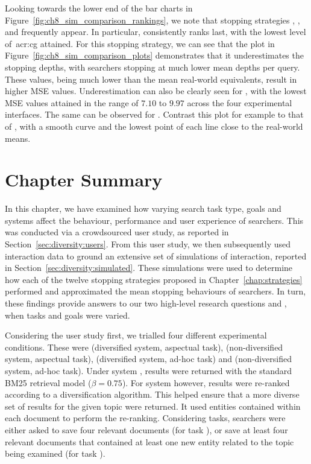 Looking towards the lower end of the bar charts in Figure~\ref{fig:ch8_sim_comparison_rankings}, we note that stopping strategies , ,  and  frequently appear. In particular,  consistently ranks last, with the lowest level of~\gls{acr:cg} attained. For this stopping strategy, we can see that the plot in Figure~\ref{fig:ch8_sim_comparison_plots} demonstrates that it underestimates the stopping depths, with searchers stopping at much lower mean depths per query. These values, being much lower than the mean real-world equivalents, result in higher MSE values. Underestimation can also be clearly seen for , with the lowest MSE values attained in the range of $7.10$ to $9.97$ across the four experimental interfaces. The same can be observed for . Contrast this plot for example to that of , with a smooth curve and the lowest point of each line close to the real-world means.


\section{Chapter Summary}
In this chapter, we have examined how varying search task type, goals and systems affect the behaviour, performance and user experience of searchers. This was conducted via a crowdsourced user study, as reported in Section~\ref{sec:diversity:users}. From this user study, we then subsequently used interaction data to ground an extensive set of simulations of interaction, reported in Section~\ref{sec:diversity:simulated}. These simulations were used to determine how each of the twelve stopping strategies proposed in Chapter~\ref{chap:strategies} performed and approximated the mean stopping behaviours of searchers. In turn, these findings provide answers to our two high-level research questions  and , when tasks and goals were varied.

Considering the user study first, we trialled four different experimental conditions. These were  (diversified system, aspectual task),  (non-diversified system, aspectual task),  (diversified system, ad-hoc task) and  (non-diversified system, ad-hoc task). Under system , results were returned with the standard BM25 retrieval model ($\beta=0.75$). For system  however, results were re-ranked according to a diversification algorithm. This helped ensure that a more diverse set of results for the given topic were returned. It used entities contained within each document to perform the re-ranking. Considering tasks, searchers were either asked to save four relevant documents (for task ), or save at least four relevant documents that contained at least one new entity related to the topic being examined (for task ).

